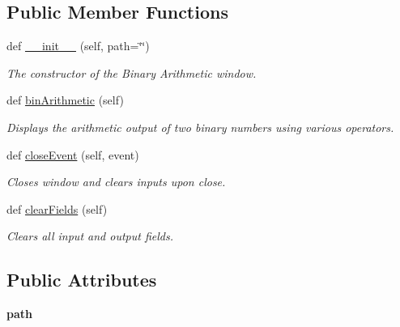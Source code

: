 \subsection*{Public Member Functions}
\begin{DoxyCompactItemize}
\item 
def \hyperlink{classbinary__arithmetic__ui_1_1_bin_arithmetic_window_a0511ad3ac87d51b48420f7dc4c4dd35d}{\+\_\+\+\_\+init\+\_\+\+\_\+} (self, path=\char`\"{}\char`\"{})
\begin{DoxyCompactList}\small\item\em The constructor of the Binary Arithmetic window. \end{DoxyCompactList}\item 
def \hyperlink{classbinary__arithmetic__ui_1_1_bin_arithmetic_window_ae3a5ab3baee92929acc1ee524456825a}{bin\+Arithmetic} (self)
\begin{DoxyCompactList}\small\item\em Displays the arithmetic output of two binary numbers using various operators. \end{DoxyCompactList}\item 
\mbox{\label{classbinary__arithmetic__ui_1_1_bin_arithmetic_window_a853d223deb5fca9a4a2479d6da8767ca}} 
def \hyperlink{classbinary__arithmetic__ui_1_1_bin_arithmetic_window_a853d223deb5fca9a4a2479d6da8767ca}{close\+Event} (self, event)
\begin{DoxyCompactList}\small\item\em Closes window and clears inputs upon close. \end{DoxyCompactList}\item 
\mbox{\label{classbinary__arithmetic__ui_1_1_bin_arithmetic_window_a46bb4aaf92f81e1044bc9ffc12076710}} 
def \hyperlink{classbinary__arithmetic__ui_1_1_bin_arithmetic_window_a46bb4aaf92f81e1044bc9ffc12076710}{clear\+Fields} (self)
\begin{DoxyCompactList}\small\item\em Clears all input and output fields. \end{DoxyCompactList}\end{DoxyCompactItemize}
\subsection*{Public Attributes}
\begin{DoxyCompactItemize}
\item 
\mbox{\label{classbinary__arithmetic__ui_1_1_bin_arithmetic_window_a33ebbcf56fc1406f4569f8db705c5dab}} 
{\bfseries path}
\end{DoxyCompactItemize}


